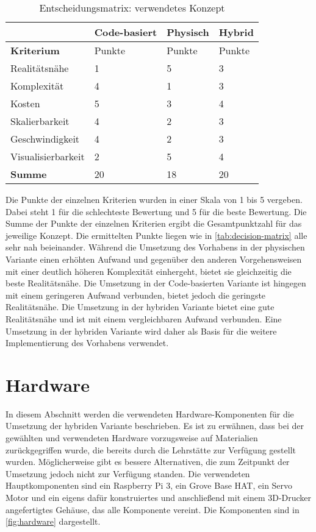 \begin{table}[H]
    \renewcommand{\arraystretch}{1.2}
    \caption{Entscheidungsmatrix: verwendetes Konzept}
    \label{tab:decision-matrix}
    \begin{tabularx}{\textwidth}{|X|X|X|X|}
        \hline
        & \textbf{Code-basiert} & \textbf{Physisch} & \textbf{Hybrid} \\
        \hline
        \textbf{Kriterium} & Punkte & Punkte & Punkte \\
        \hline
        Realitätsnähe & 1 & 5 & 3 \\
        \hline
        Komplexität & 4 & 1 & 3 \\
        \hline
        Kosten & 5 & 3 & 4 \\
        \hline
        Skalierbarkeit & 4 & 2 & 3 \\
        \hline
        Geschwindigkeit & 4 & 2 & 3 \\
        \hline
        Visualisierbarkeit & 2 & 5 & 4 \\
        \hline
        \rowcolor{gray!50}
        \textbf{Summe} & 20 & 18 & 20 \\
        \hline
    \end{tabularx}
\end{table}

Die Punkte der einzelnen Kriterien wurden in einer Skala von 1 bis 5 vergeben. Dabei steht 1 für die schlechteste Bewertung und 5 für die beste Bewertung. Die Summe der Punkte der einzelnen Kriterien ergibt die Gesamtpunktzahl für das jeweilige Konzept. Die ermittelten Punkte liegen wie in \autoref{tab:decision-matrix} alle sehr nah beieinander. Während die Umsetzung des Vorhabens in der physischen Variante einen erhöhten Aufwand und gegenüber den anderen Vorgehensweisen mit einer deutlich höheren Komplexität einhergeht, bietet sie gleichzeitig die beste Realitätsnähe. Die Umsetzung in der Code-basierten Variante ist hingegen mit einem geringeren Aufwand verbunden, bietet jedoch die geringste Realitätsnähe. Die Umsetzung in der hybriden Variante bietet eine gute Realitätsnähe und ist mit einem vergleichbaren Aufwand verbunden. Eine Umsetzung in der hybriden Variante wird daher als Basis für die weitere Implementierung des Vorhabens verwendet. 

\section{Hardware}
In diesem Abschnitt werden die verwendeten Hardware-Komponenten für die Umsetzung der hybriden Variante beschrieben. Es ist zu erwähnen, dass bei der gewählten und verwendeten Hardware vorzugsweise auf Materialien zurückgegriffen wurde, die bereits durch die Lehrstätte zur Verfügung gestellt wurden. Möglicherweise gibt es bessere Alternativen, die zum Zeitpunkt der Umsetzung jedoch nicht zur Verfügung standen. Die verwendeten Hauptkomponenten sind ein Raspberry Pi 3, ein Grove Base HAT, ein Servo Motor und ein eigens dafür konstruiertes und anschließend mit einem 3D-Drucker angefertigtes Gehäuse, das alle Komponente vereint. Die Komponenten sind in \autoref{fig:hardware} dargestellt.

